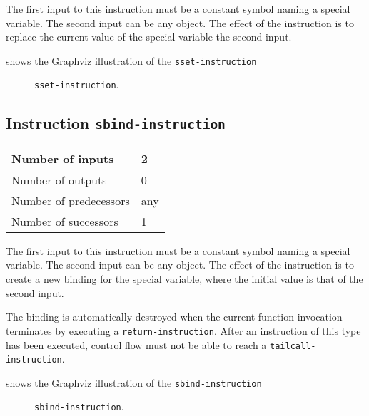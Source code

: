 The first input to this instruction must be a constant symbol naming a
special variable.  The second input can be any object.  The effect of
the instruction is to replace the current value of the special
variable the second input.

 shows the Graphviz illustration of the
\texttt{sset-instruction}

\begin{figure}
\begin{center}
\end{center}
\caption{\label{fig-sset-instruction}
\texttt{sset-instruction}.}
\end{figure}

\subsection{Instruction \texttt{sbind-instruction}}
\label{mir-instruction-sbind}

\begin{tabular}{|l|l|}
\hline
Number of inputs & 2\\
\hline
Number of outputs & 0\\
\hline
Number of predecessors & any\\
\hline
Number of successors & 1\\
\hline
\end{tabular}

The first input to this instruction must be a constant symbol naming a
special variable.  The second input can be any object.  The effect of
the instruction is to create a new binding for the special variable,
where the initial value is that of the second input.

The binding is automatically destroyed when the current function
invocation terminates by executing a \texttt{return-instruction}.
After an instruction of this type has been executed, control flow must
not be able to reach a \texttt{tailcall-instruction}. 

 shows the Graphviz illustration of the
\texttt{sbind-instruction}

\begin{figure}
\begin{center}
\end{center}
\caption{\label{fig-sbind-instruction}
\texttt{sbind-instruction}.}
\end{figure}

